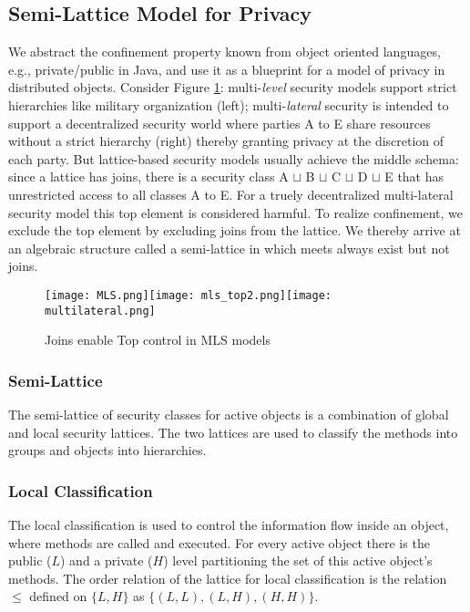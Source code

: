 \documentclass[10pt, conference, compsocconf]{IEEEtran}
\begin{document}
\subsection{Semi-Lattice Model for Privacy}
\label{sec:sml4mls}
We abstract the confinement property known from object oriented languages, e.g., 
private/public in Java,
and use it as a blueprint for a model of privacy in distributed objects. 
Consider Figure \ref{fig:mls}: multi-{\it level} security models support strict hierarchies 
like military  organization (left); multi-{\it lateral} security \cite[Ch. 8]{and:01} 
is intended to support a decentralized security world where 
parties A to E share resources without a strict hierarchy (right) thereby granting 
privacy at the discretion of each party. But lattice-based security models usually
achieve the middle schema: since a lattice 
has joins, there is a security class A $\sqcup$ B $\sqcup$ C $\sqcup$ D $\sqcup$ E 
that has unrestricted access to all 
classes A to E. For a truely decentralized multi-lateral security model 
this top element is considered harmful. 
To realize confinement, we exclude the top element by excluding joins from the lattice. 
We thereby arrive at an algebraic structure called a semi-lattice in which meets always 
exist but not joins.
\begin{figure}
\vspace{-3ex}
\begin{center}
\texttt{[image: MLS.png]}\texttt{[image: mls\_top2.png]}\texttt{[image: multilateral.png]}
\vspace{-2ex}
\caption{Joins enable Top control in MLS models}
\label{fig:mls}
\end{center}
\vspace{-3ex}
\end{figure}

\subsubsection*{Semi-Lattice}
The semi-lattice of security classes for active objects is a combination of
global and local security lattices. The two lattices are used to classify
the methods into groups and objects into hierarchies.

\subsubsection{Local Classification}
The local classification is used to control the information flow inside an
object, where methods are called and executed. For every active object there is the public ($L$) and a private
($H$) level partitioning the set of this active object's methods. 
The order relation of the lattice for local classification is the relation $\leq$ 
defined on $\{L,H\}$ as $\{(L,L),(L,H),(H,H)\}$.
\end{document}
